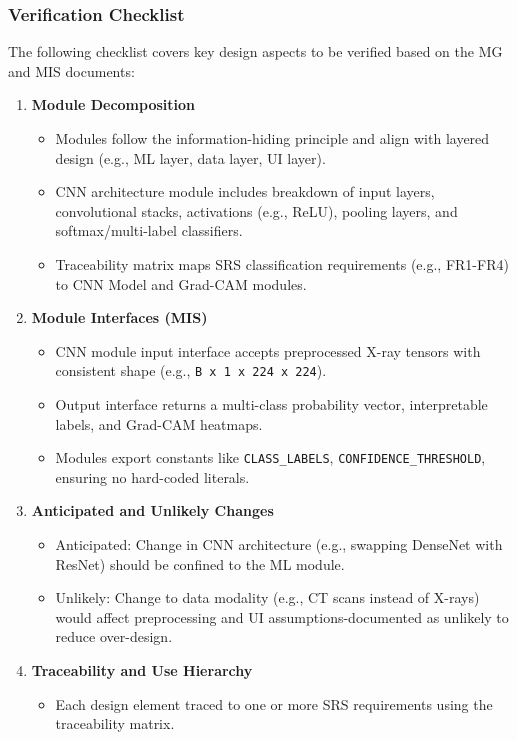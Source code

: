 \documentclass[12pt, titlepage]{article}
\begin{document}
\subsubsection{Verification Checklist}
The following checklist covers key design aspects to be verified based on the MG and MIS documents:
\begin{enumerate}
  \item \textbf{Module Decomposition}
    \begin{itemize}
      \item Modules follow the information-hiding principle and align with layered design (e.g., ML layer, data layer, UI layer).
      \item CNN architecture module includes breakdown of input layers, convolutional stacks, activations (e.g., ReLU), pooling layers, and softmax/multi-label classifiers.
      \item Traceability matrix maps SRS classification requirements (e.g., FR1-FR4) to CNN Model and Grad-CAM modules.
    \end{itemize}
  \item \textbf{Module Interfaces (MIS)}
    \begin{itemize}
      \item CNN module input interface accepts preprocessed X-ray tensors with consistent shape (e.g., \texttt{B x 1 x 224 x 224}).
      \item Output interface returns a multi-class probability vector, interpretable labels, and Grad-CAM heatmaps.
      \item Modules export constants like \texttt{CLASS\_LABELS}, \texttt{CONFIDENCE\_THRESHOLD}, ensuring no hard-coded literals.
    \end{itemize}
  \item \textbf{Anticipated and Unlikely Changes}
    \begin{itemize}
      \item Anticipated: Change in CNN architecture (e.g., swapping DenseNet with ResNet) should be confined to the ML module.
      \item Unlikely: Change to data modality (e.g., CT scans instead of X-rays) would affect preprocessing and UI assumptions-documented as unlikely to reduce over-design.
    \end{itemize}
  \item \textbf{Traceability and Use Hierarchy}
    \begin{itemize}
      \item Each design element traced to one or more SRS requirements using the traceability matrix.

\end{itemize}
\end{enumerate}
\end{document}

